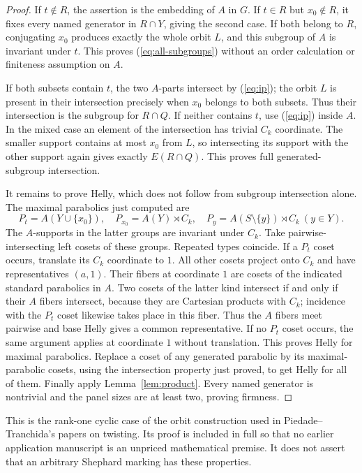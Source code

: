 \begin{proof}
If $t\notin R$, the assertion is the embedding of $A$ in $G$.
If $t\in R$ but $x_0\notin R$, it fixes every named generator in
$R\cap Y$, giving the second case. If both belong to $R$, conjugating
$x_0$ produces exactly the whole orbit $L$, and this subgroup of $A$
is invariant under $t$. This proves (\ref{eq:all-subgroups}) without
an order calculation or finiteness assumption on $A$.

If both subsets contain $t$, the two $A$-parts intersect by
(\ref{eq:ip}); the orbit $L$ is present in their intersection precisely
when $x_0$ belongs to both subsets. Thus their intersection is the
subgroup for $R\cap Q$. If neither contains $t$, use (\ref{eq:ip})
inside $A$. In the mixed case an element of the intersection has trivial
$C_k$ coordinate. The smaller support contains at most $x_0$ from $L$,
so intersecting its support with the other support again gives exactly
$E(R\cap Q)$. This proves full generated-subgroup intersection.

It remains to prove Helly, which does not follow from subgroup
intersection alone. The maximal parabolics just computed are
\begin{equation}\label{eq:maximal}
 P_t=A(Y\cup\{x_0\}),\quad
 P_{x_0}=A(Y)\rtimes C_k,\quad
 P_y=A(S\setminus\{y\})\rtimes C_k\ (y\in Y).
\end{equation}
The $A$-supports in the latter groups are invariant under $C_k$.
Take pairwise-intersecting left cosets of these groups. Repeated types
coincide. If a $P_t$ coset occurs, translate its $C_k$ coordinate to
$1$. All other cosets project onto $C_k$ and have representatives
$(a,1)$. Their fibers at coordinate $1$ are cosets of the indicated
standard parabolics in $A$. Two cosets of the latter kind intersect
if and only if their $A$ fibers intersect, because they are Cartesian
products with $C_k$; incidence with the $P_t$ coset likewise takes
place in this fiber. Thus the $A$ fibers meet pairwise and base Helly
gives a common representative. If no $P_t$ coset occurs, the same
argument applies at coordinate $1$ without translation. This proves
Helly for maximal parabolics. Replace a coset of any generated
parabolic by its maximal-parabolic cosets, using the intersection
property just proved, to get Helly for all of them. Finally apply
Lemma~\ref{lem:product}. Every named generator is nontrivial and the
panel sizes are at least two, proving firmness.
\end{proof}
This is the rank-one cyclic case of the orbit construction used in
Piedade--Tranchida's papers on twisting. Its proof is included in full
so that no earlier application manuscript is an unpriced mathematical
premise. It does not assert that an arbitrary Shephard marking has
these properties.

